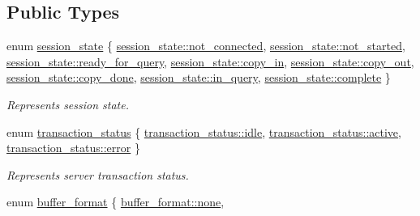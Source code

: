 \subsection*{Public Types}
\begin{DoxyCompactItemize}
\item 
enum \hyperlink{classsession_a0975e57d194ae722629afe127b70a0b5}{session\+\_\+state} \{ \newline
\hyperlink{classsession_a0975e57d194ae722629afe127b70a0b5a69c2dbb5917ca550a862e9c1c839bca1}{session\+\_\+state\+::not\+\_\+connected}, 
\hyperlink{classsession_a0975e57d194ae722629afe127b70a0b5af2ce0a12c87232833f9cb7da138c60f6}{session\+\_\+state\+::not\+\_\+started}, 
\hyperlink{classsession_a0975e57d194ae722629afe127b70a0b5a8d908e4fcc8e9f7efe09349ff694e85e}{session\+\_\+state\+::ready\+\_\+for\+\_\+query}, 
\hyperlink{classsession_a0975e57d194ae722629afe127b70a0b5ad318bf011157b5e4bccd36b488ef9607}{session\+\_\+state\+::copy\+\_\+in}, 
\newline
\hyperlink{classsession_a0975e57d194ae722629afe127b70a0b5a0ec00c27392ee005557a694d094e8e6c}{session\+\_\+state\+::copy\+\_\+out}, 
\hyperlink{classsession_a0975e57d194ae722629afe127b70a0b5ad3029a376fb4f41164f381450edfe584}{session\+\_\+state\+::copy\+\_\+done}, 
\hyperlink{classsession_a0975e57d194ae722629afe127b70a0b5a007b447a7ea0f478e3ccae0dae5289c1}{session\+\_\+state\+::in\+\_\+query}, 
\hyperlink{classsession_a0975e57d194ae722629afe127b70a0b5ad9a22d7a8178d5b42a8750123cbfe5b1}{session\+\_\+state\+::complete}
 \}\begin{DoxyCompactList}\small\item\em Represents session state. \end{DoxyCompactList}
\item 
enum \hyperlink{classsession_aeb070c1920b6b9948f2d98b4b8787ddb}{transaction\+\_\+status} \{ \hyperlink{classsession_aeb070c1920b6b9948f2d98b4b8787ddbaec2f993aec2c27fc750119ab17b16cdb}{transaction\+\_\+status\+::idle}, 
\hyperlink{classsession_aeb070c1920b6b9948f2d98b4b8787ddbac76a5e84e4bdee527e274ea30c680d79}{transaction\+\_\+status\+::active}, 
\hyperlink{classsession_aeb070c1920b6b9948f2d98b4b8787ddbacb5e100e5a9a3e7f6d1fd97512215282}{transaction\+\_\+status\+::error}
 \}\begin{DoxyCompactList}\small\item\em Represents server transaction status. \end{DoxyCompactList}
\item 
enum \hyperlink{classsession_a960cb940bd12cd63c142c1ffae816b24}{buffer\+\_\+format} \{ \hyperlink{classsession_a960cb940bd12cd63c142c1ffae816b24a334c4a4c42fdb79d7ebc3e73b517e6f8}{buffer\+\_\+format\+::none}, 

\end{DoxyCompactItemize}
